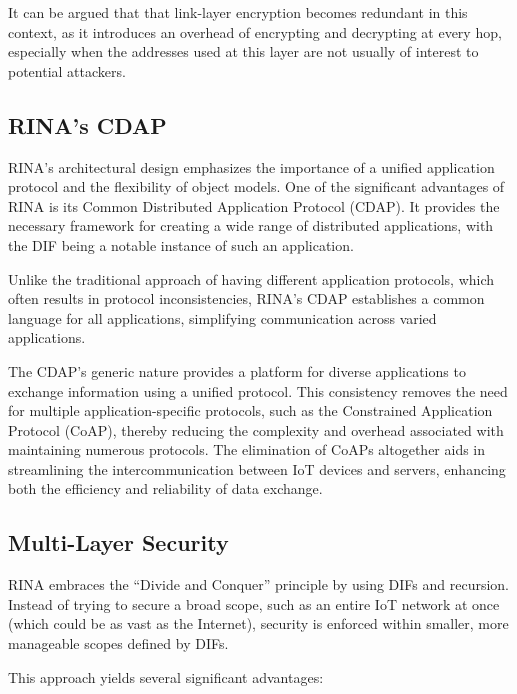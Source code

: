 \documentclass{ieeeaccess}
\begin{document}
It can be argued that that link-layer encryption becomes redundant in this context, as it introduces an overhead of encrypting and decrypting at every hop, especially when the addresses used at this layer are not usually of interest to potential attackers.

\subsection{RINA's CDAP}
RINA's architectural design emphasizes the importance of a unified application protocol and the flexibility of object models. One of the significant advantages of RINA is its Common Distributed Application Protocol (CDAP). It provides the necessary framework for creating a wide range of distributed applications, with the DIF being a notable instance of such an application.

Unlike the traditional approach of having different application protocols, which often results in protocol inconsistencies, RINA's CDAP establishes a common language for all applications, simplifying communication across varied applications.

The CDAP's generic nature provides a platform for diverse applications to exchange information using a unified protocol. This consistency removes the need for multiple application-specific protocols, such as the Constrained Application Protocol (CoAP), thereby reducing the complexity and overhead associated with maintaining numerous protocols. The elimination of CoAPs altogether aids in streamlining the intercommunication between IoT devices and servers, enhancing both the efficiency and reliability of data exchange.

\subsection{Multi-Layer Security}
RINA embraces the ``Divide and Conquer'' principle by using DIFs and recursion. Instead of trying to secure a broad scope, such as an entire IoT network at once (which could be as vast as the Internet), security is enforced within smaller, more manageable scopes defined by DIFs.

This approach yields several significant advantages:
\end{document}
